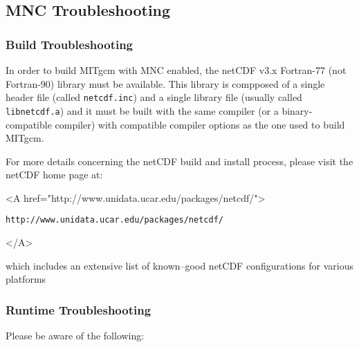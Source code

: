 \subsection{MNC Troubleshooting}

\subsubsection{Build Troubleshooting}

In order to build MITgcm with MNC enabled, the netCDF v3.x Fortran-77
(not Fortran-90) library must be available.  This library is compposed
of a single header file (called \texttt{netcdf.inc}) and a single
library file (usually called \texttt{libnetcdf.a}) and it must be
built with the same compiler (or a binary-compatible compiler) with
compatible compiler options as the one used to build MITgcm.

For more details concerning the netCDF build and install process,
please visit the netCDF home page at:
\begin{rawhtml} <A href="http://www.unidata.ucar.edu/packages/netcdf/"> \end{rawhtml}
\begin{verbatim}
http://www.unidata.ucar.edu/packages/netcdf/
\end{verbatim}
\begin{rawhtml} </A> \end{rawhtml} 
which includes an extensive list of known--good netCDF configurations
for various platforms

\subsubsection{Runtime Troubleshooting}

Please be aware of the following:

